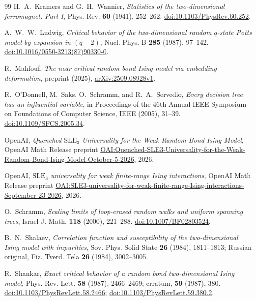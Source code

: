 \begin{thebibliography}{99}
H.~A.~Kramers and G.~H.~Wannier,
\emph{Statistics of the two-dimensional ferromagnet. Part I},
Phys. Rev. \textbf{60} (1941), 252--262.
\href{https://doi.org/10.1103/PhysRev.60.252}{doi:10.1103/PhysRev.60.252}.

A.~W.~W.~Ludwig,
\emph{Critical behavior of the two-dimensional random $q$-state Potts model by expansion in $(q-2)$},
Nucl. Phys. B \textbf{285} (1987), 97--142.
\href{https://doi.org/10.1016/0550-3213(87)90330-0}{doi:10.1016/0550-3213(87)90330-0}.

R.~Mahfouf,
\emph{The near critical random bond Ising model via embedding deformation},
preprint (2025), \href{https://arxiv.org/abs/2509.08928v1}{arXiv:2509.08928v1}.

R.~O'Donnell, M.~Saks, O.~Schramm, and R.~A.~Servedio,
\emph{Every decision tree has an influential variable},
in Proceedings of the 46th Annual IEEE Symposium on Foundations of Computer Science,
IEEE (2005), 31--39.
\href{https://doi.org/10.1109/SFCS.2005.34}{doi:10.1109/SFCS.2005.34}.

OpenAI,
\emph{Quenched $\mathrm{SLE}_3$ Universality for the Weak Random-Bond Ising Model},
OpenAI Math Release preprint
\href{https://github.com/openai/math/blob/main/preprints/Quenched-SLE3-Universality-for-the-Weak-Random-Bond-Ising-Model-October-5-2026/quenched-sle3-weak-random-bond-ising.pdf}{OAI:Quenched-SLE3-Universality-for-the-Weak-Random-Bond-Ising-Model-October-5-2026},
2026.

OpenAI,
\emph{$\mathrm{SLE}_3$ universality for weak finite-range Ising interactions},
OpenAI Math Release preprint
\href{https://github.com/openai/math/blob/main/preprints/SLE3-universality-for-weak-finite-range-Ising-interactions-September-23-2026/paper.pdf}{OAI:SLE3-universality-for-weak-finite-range-Ising-interactions-September-23-2026},
2026.

O.~Schramm,
\emph{Scaling limits of loop-erased random walks and uniform spanning trees},
Israel J. Math. \textbf{118} (2000), 221--288.
\href{https://doi.org/10.1007/BF02803524}{doi:10.1007/BF02803524}.

B.~N.~Shalaev,
\emph{Correlation function and susceptibility of the two-dimensional Ising model with impurities},
Sov. Phys. Solid State \textbf{26} (1984), 1811--1813;
Russian original, Fiz. Tverd. Tela \textbf{26} (1984), 3002--3005.

R.~Shankar,
\emph{Exact critical behavior of a random bond two-dimensional Ising model},
Phys. Rev. Lett. \textbf{58} (1987), 2466--2469;
erratum, \textbf{59} (1987), 380.
\href{https://doi.org/10.1103/PhysRevLett.58.2466}{doi:10.1103/PhysRevLett.58.2466};
\href{https://doi.org/10.1103/PhysRevLett.59.380.2}{doi:10.1103/PhysRevLett.59.380.2}.


\end{thebibliography}

